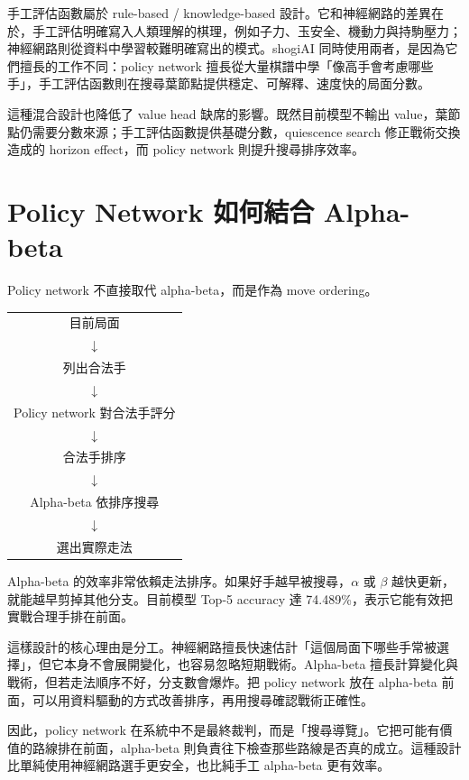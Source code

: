 \documentclass[12pt,a4paper,fontset=none]{ctexart}
\begin{document}
手工評估函數屬於 rule-based / knowledge-based 設計。它和神經網路的差異在於，手工評估明確寫入人類理解的棋理，例如子力、玉安全、機動力與持駒壓力；神經網路則從資料中學習較難明確寫出的模式。shogiAI 同時使用兩者，是因為它們擅長的工作不同：policy network 擅長從大量棋譜中學「像高手會考慮哪些手」，手工評估函數則在搜尋葉節點提供穩定、可解釋、速度快的局面分數。

這種混合設計也降低了 value head 缺席的影響。既然目前模型不輸出 value，葉節點仍需要分數來源；手工評估函數提供基礎分數，quiescence search 修正戰術交換造成的 horizon effect，而 policy network 則提升搜尋排序效率。

\section{Policy Network 如何結合 Alpha-beta}

Policy network 不直接取代 alpha-beta，而是作為 move ordering。

\begin{center}
\begin{tabular}{c}
目前局面 \\
$\downarrow$ \\
列出合法手 \\
$\downarrow$ \\
Policy network 對合法手評分 \\
$\downarrow$ \\
合法手排序 \\
$\downarrow$ \\
Alpha-beta 依排序搜尋 \\
$\downarrow$ \\
選出實際走法
\end{tabular}
\end{center}

Alpha-beta 的效率非常依賴走法排序。如果好手越早被搜尋，$\alpha$ 或 $\beta$ 越快更新，就能越早剪掉其他分支。目前模型 Top-5 accuracy 達 74.489\%，表示它能有效把實戰合理手排在前面。

這樣設計的核心理由是分工。神經網路擅長快速估計「這個局面下哪些手常被選擇」，但它本身不會展開變化，也容易忽略短期戰術。Alpha-beta 擅長計算變化與戰術，但若走法順序不好，分支數會爆炸。把 policy network 放在 alpha-beta 前面，可以用資料驅動的方式改善排序，再用搜尋確認戰術正確性。

因此，policy network 在系統中不是最終裁判，而是「搜尋導覽」。它把可能有價值的路線排在前面，alpha-beta 則負責往下檢查那些路線是否真的成立。這種設計比單純使用神經網路選手更安全，也比純手工 alpha-beta 更有效率。
\end{document}
